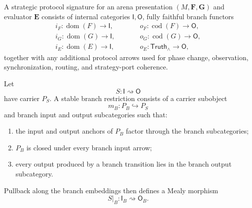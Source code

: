\begin{definition}
\label{def:strategic-protocol-signature}
A strategic protocol signature for an arena presentation \((M,\mathbf F,\mathbf G)\) and evaluator
\(\mathbf E\) consists of internal categories \(\mathsf I,\mathsf O\), fully faithful branch
functors
\[
\begin{array}{lll}
  i_F:\operatorname{dom}(F)\to\mathsf I,
  &\qquad&
  o_F:\operatorname{cod}(F)\to\mathsf O,
  \\
  i_G:\operatorname{dom}(G)\to\mathsf I,
  &&
  o_G:\operatorname{cod}(G)\to\mathsf O,
  \\
  i_E:\operatorname{dom}(E)\to\mathsf I,
  &&
  o_E:\mathsf{Truth}_\wedge\to\mathsf O,
\end{array}
\]
together with any additional protocol arrows used for phase change, observation, synchronization,
routing, and strategy-port coherence.
\end{definition}

\begin{definition}
\label{def:stable-branch-restriction}
Let
\[
  S:\mathsf I\rightsquigarrow\mathsf O
\]
have carrier \(P_S\). A stable branch restriction consists of a carrier subobject
\[
  m_B:P_B\hookrightarrow P_S
\]
and branch input and output subcategories such that:
\begin{enumerate}
  \item the input and output anchors of \(P_B\) factor through the branch subcategories;
  \item \(P_B\) is closed under every branch input arrow;
  \item every output produced by a branch transition lies in the branch output subcategory.
\end{enumerate}
Pullback along the branch embeddings then defines a Mealy morphism
\[
  S|_B:\mathsf I_B\rightsquigarrow\mathsf O_B.
\]
\end{definition}

